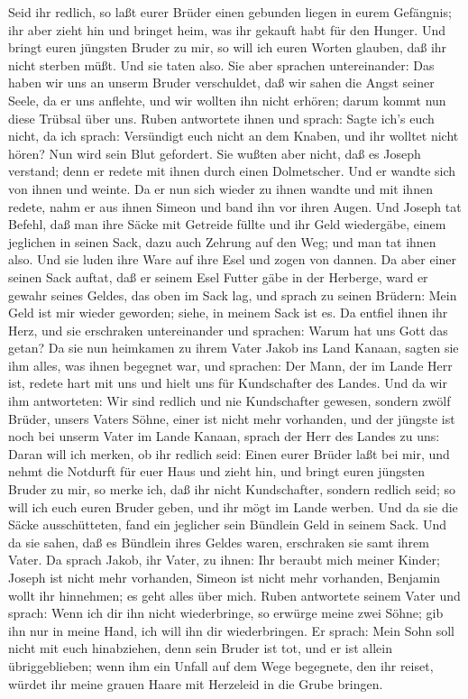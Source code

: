  Seid ihr redlich, so laßt eurer Brüder einen gebunden
liegen in eurem Gefängnis; ihr aber zieht hin und bringet heim, was ihr
gekauft habt für den Hunger.  Und bringt euren jüngsten
Bruder zu mir, so will ich euren Worten glauben, daß ihr nicht sterben
müßt. Und sie taten also.  Sie aber sprachen untereinander:
Das haben wir uns an unserm Bruder verschuldet, daß wir sahen die Angst
seiner Seele, da er uns anflehte, und wir wollten ihn nicht erhören;
darum kommt nun diese Trübsal über uns.  Ruben antwortete
ihnen und sprach: Sagte ich's euch nicht, da ich sprach: Versündigt euch
nicht an dem Knaben, und ihr wolltet nicht hören? Nun wird sein Blut
gefordert.  Sie wußten aber nicht, daß es Joseph verstand;
denn er redete mit ihnen durch einen Dolmetscher.  Und er
wandte sich von ihnen und weinte. Da er nun sich wieder zu ihnen wandte
und mit ihnen redete, nahm er aus ihnen Simeon und band ihn vor ihren
Augen.  Und Joseph tat Befehl, daß man ihre Säcke mit
Getreide füllte und ihr Geld wiedergäbe, einem jeglichen in seinen Sack,
dazu auch Zehrung auf den Weg; und man tat ihnen also.  Und
sie luden ihre Ware auf ihre Esel und zogen von dannen.  Da
aber einer seinen Sack auftat, daß er seinem Esel Futter gäbe in der
Herberge, ward er gewahr seines Geldes, das oben im Sack lag,
 und sprach zu seinen Brüdern: Mein Geld ist mir wieder
geworden; siehe, in meinem Sack ist es. Da entfiel ihnen ihr Herz, und
sie erschraken untereinander und sprachen: Warum hat uns Gott das getan?
 Da sie nun heimkamen zu ihrem Vater Jakob ins Land Kanaan,
sagten sie ihm alles, was ihnen begegnet war, und sprachen:
 Der Mann, der im Lande Herr ist, redete hart mit uns und
hielt uns für Kundschafter des Landes.  Und da wir ihm
antworteten: Wir sind redlich und nie Kundschafter gewesen,
 sondern zwölf Brüder, unsers Vaters Söhne, einer ist nicht
mehr vorhanden, und der jüngste ist noch bei unserm Vater im Lande
Kanaan,  sprach der Herr des Landes zu uns: Daran will ich
merken, ob ihr redlich seid: Einen eurer Brüder laßt bei mir, und nehmt
die Notdurft für euer Haus und zieht hin,  und bringt euren
jüngsten Bruder zu mir, so merke ich, daß ihr nicht Kundschafter,
sondern redlich seid; so will ich euch euren Bruder geben, und ihr mögt
im Lande werben.  Und da sie die Säcke ausschütteten, fand
ein jeglicher sein Bündlein Geld in seinem Sack. Und da sie sahen, daß
es Bündlein ihres Geldes waren, erschraken sie samt ihrem Vater.
 Da sprach Jakob, ihr Vater, zu ihnen: Ihr beraubt mich
meiner Kinder; Joseph ist nicht mehr vorhanden, Simeon ist nicht mehr
vorhanden, Benjamin wollt ihr hinnehmen; es geht alles über mich.
 Ruben antwortete seinem Vater und sprach: Wenn ich dir ihn
nicht wiederbringe, so erwürge meine zwei Söhne; gib ihn nur in meine
Hand, ich will ihn dir wiederbringen.  Er sprach: Mein Sohn
soll nicht mit euch hinabziehen, denn sein Bruder ist tot, und er ist
allein übriggeblieben; wenn ihm ein Unfall auf dem Wege begegnete, den
ihr reiset, würdet ihr meine grauen Haare mit Herzeleid in die Grube
bringen.

